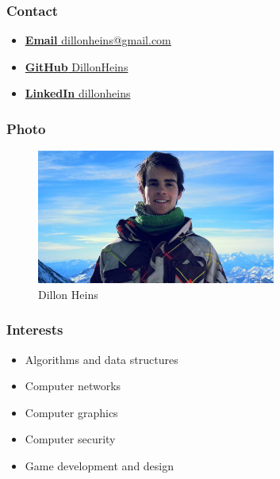 \documentclass{article}
\begin{document}
	\subsubsection{Contact}
		\begin{itemize}
			\item \href{mailto:dillonheins@gmail.com}{\textbf{Email} dillonheins@gmail.com}
			\item \href{https://github.com/DillonHeins}{\textbf{GitHub} DillonHeins}
			\item \href{https://za.linkedin.com/in/dillon-heins-54275810}{\textbf{LinkedIn} dillonheins}
		\end{itemize}
	\subsubsection{Photo}
		\begin{figure}[H]
			\centering
			\includegraphics[width=0.7\textwidth]{../dillon.jpg}
			\caption{Dillon Heins}
		\end{figure}
	\subsubsection{Interests}
		\begin{itemize}
			\item Algorithms and data structures
			\item Computer networks
			\item Computer graphics
			\item Computer security
			\item Game development and design
		\end{itemize}
\end{document}
